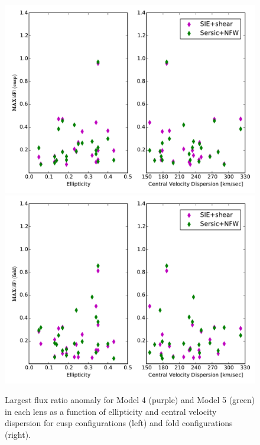 \begin{figure}
	{\includegraphics[trim=0cm 0.3cm 0cm 0.3cm,clip,width=.48\textwidth]{./figures_sls/EllipVdis_vs_fluxratio_maxanomaly_cusp-eps-converted-to.pdf}}
	{\includegraphics[trim=0cm 0.3cm 0cm 0.3cm,clip,width=.48\textwidth]{./figures_sls/EllipVdis_vs_fluxratio_maxanomaly_fold-eps-converted-to.pdf}}
	\caption{\label{fig:fluxratios_45}Largest flux ratio anomaly for Model 4 (purple) and Model 5 (green) in each lens as a function of ellipticity and central velocity dispersion for cusp configurations (left) and fold configurations (right).}
\end{figure}
